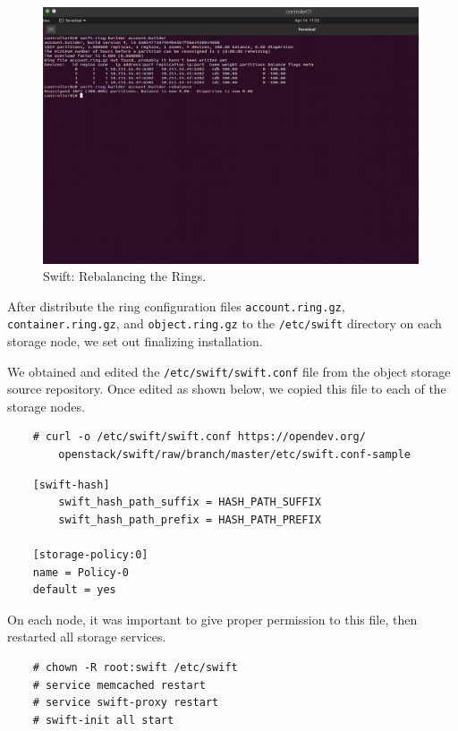 \documentclass{article}
\begin{document}
\begin{figure}[ht]
    \centering
    \includegraphics[width=0.99\textwidth]{Rebalance.png}
    \caption{Swift: Rebalancing the Rings.}
    \label{fig:Rebalance}
\end{figure}

After distribute the ring configuration files \texttt{account.ring.gz}, \texttt{container.ring.gz}, and \texttt{object.ring.gz} to the \texttt{/etc/swift} directory on each storage node, we set out finalizing installation.

We obtained and edited the \texttt{/etc/swift/swift.conf} file from the object storage source repository. Once edited as shown below, we copied this file to each of the storage nodes.

\begin{verbatim}
    # curl -o /etc/swift/swift.conf https://opendev.org/
        openstack/swift/raw/branch/master/etc/swift.conf-sample
\end{verbatim}

\begin{verbatim}
    [swift-hash]
        swift_hash_path_suffix = HASH_PATH_SUFFIX
        swift_hash_path_prefix = HASH_PATH_PREFIX

    [storage-policy:0]
    name = Policy-0
    default = yes
\end{verbatim}

On each node, it was important to give proper permission to this file, then restarted all storage services.

\begin{verbatim}
    # chown -R root:swift /etc/swift
    # service memcached restart
    # service swift-proxy restart
    # swift-init all start
\end{verbatim}
\end{document}
